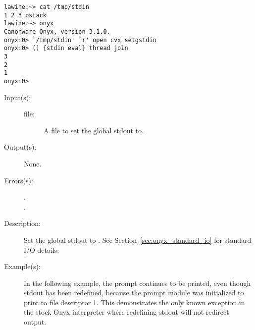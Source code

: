 \begin{description}
\begin{description}
\begin{verbatim}
lawine:~> cat /tmp/stdin
1 2 3 pstack
lawine:~> onyx 
Canonware Onyx, version 3.1.0.
onyx:0> `/tmp/stdin' `r' open cvx setgstdin
onyx:0> () {stdin eval} thread join
3
2
1
onyx:0>
		\end{verbatim}
	\end{description}
\label{systemdict:setgstdout}
\item[{\onyxop{file}{setgstdout}{--}}: ]
	\begin{description}\item[]
	\item[Input(s): ]
		\begin{description}\item[]
		\item[file: ]
			A file to set the global stdout to.
		\end{description}
	\item[Output(s): ] None.
	\item[Errors(s): ]
		\begin{description}\item[]
		\item[.]
		\item[.]
		\end{description}
	\item[Description: ]
		Set the global stdout to .  See
		Section~\ref{sec:onyx_standard_io} for standard I/O details.
	\item[Example(s): ]
		In the following example, the prompt continues to be printed,
		even though stdout has been redefined, because the prompt module
		was initialized to print to file descriptor 1.  This
		demonstrates the only known exception in the stock Onyx
		interpreter where redefining stdout will not redirect output.
\begin{verbatim}


\end{verbatim}
\end{description}
\end{description}
